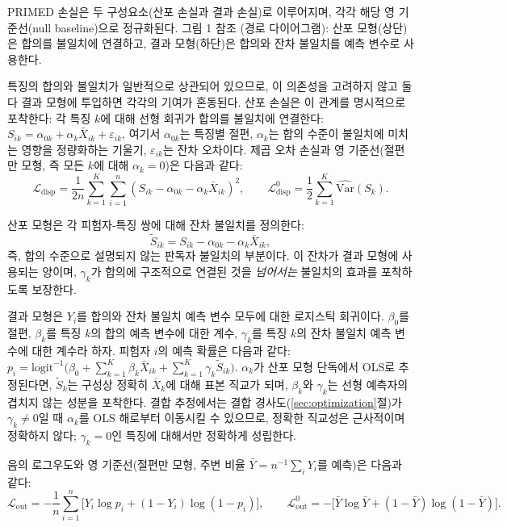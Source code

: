 \documentclass[a4paper,11pt]{article}
\begin{document}
PRIMED 손실은 두 구성요소(산포 손실과 결과 손실)로 이루어지며, 각각 해당 영 기준선(null baseline)으로 정규화된다.
그림 1 참조 (경로 다이어그램): 산포 모형(상단)은 합의를 불일치에 연결하고, 결과 모형(하단)은 합의와 잔차 불일치를 예측 변수로 사용한다.

특징의 합의와 불일치가 일반적으로 상관되어 있으므로, 이 의존성을 고려하지 않고 둘 다 결과 모형에 투입하면 각각의 기여가 혼동된다.
산포 손실은 이 관계를 명시적으로 포착한다: 각 특징 $k$에 대해 선형 회귀가 합의를 불일치에 연결한다:
$S_{ik} = \alpha_{0k} + \alpha_k \bar X_{ik} + \varepsilon_{ik}$,
여기서 $\alpha_{0k}$는 특징별 절편, $\alpha_k$는 합의 수준이 불일치에 미치는 영향을 정량화하는 기울기, $\varepsilon_{ik}$는 잔차 오차이다.
제곱 오차 손실과 영 기준선(절편만 모형, 즉 모든 $k$에 대해 $\alpha_k = 0$)은 다음과 같다:
\[
  \mathcal{L}_{\mathrm{disp}} = \frac{1}{2n}\sum_{k=1}^K \sum_{i=1}^n (S_{ik} - \alpha_{0k} - \alpha_k \bar X_{ik})^2,
  \qquad
  \mathcal{L}_{\mathrm{disp}}^0 = \frac{1}{2}\sum_{k=1}^K \widehat{\mathrm{Var}}(S_k).
\]

산포 모형은 각 피험자-특징 쌍에 대해 잔차 불일치를 정의한다:
\[
  \tilde S_{ik} = S_{ik} - \alpha_{0k} - \alpha_k \bar X_{ik},
\]
즉, 합의 수준으로 설명되지 않는 판독자 불일치의 부분이다.
이 잔차가 결과 모형에 사용되는 양이며, $\gamma_k$가 합의에 구조적으로 연결된 것을 \emph{넘어서는} 불일치의 효과를 포착하도록 보장한다.

결과 모형은 $Y_i$를 합의와 잔차 불일치 예측 변수 모두에 대한 로지스틱 회귀이다.
$\beta_0$를 절편, $\beta_k$를 특징 $k$의 합의 예측 변수에 대한 계수, $\gamma_k$를 특징 $k$의 잔차 불일치 예측 변수에 대한 계수라 하자.
피험자 $i$의 예측 확률은 다음과 같다:
$p_i = \mathrm{logit}^{-1}\!\bigl(\beta_0 + \sum_{k=1}^K \beta_k \bar X_{ik} + \sum_{k=1}^K \gamma_k \tilde S_{ik}\bigr)$.
$\alpha_k$가 산포 모형 단독에서 OLS로 추정된다면, $\tilde S_k$는 구성상 정확히 $\bar X_k$에 대해 표본 직교가 되며, $\beta_k$와 $\gamma_k$는 선형 예측자의 겹치지 않는 성분을 포착한다.
결합 추정에서는 결합 경사도(\ref{sec:optimization}절)가 $\gamma_k \neq 0$일 때 $\alpha_k$를 OLS 해로부터 이동시킬 수 있으므로, 정확한 직교성은 근사적이며 정확하지 않다; $\gamma_k = 0$인 특징에 대해서만 정확하게 성립한다.

음의 로그우도와 영 기준선(절편만 모형, 주변 비율 $\bar Y = n^{-1}\sum_i Y_i$를 예측)은 다음과 같다:
\[
  \mathcal{L}_{\mathrm{out}} = -\frac{1}{n}\sum_{i=1}^n \bigl[Y_i \log p_i + (1-Y_i)\log(1-p_i)\bigr],
  \qquad
  \mathcal{L}_{\mathrm{out}}^0 = -\bigl[\bar Y \log \bar Y + (1-\bar Y)\log(1-\bar Y)\bigr].
\]
\end{document}
